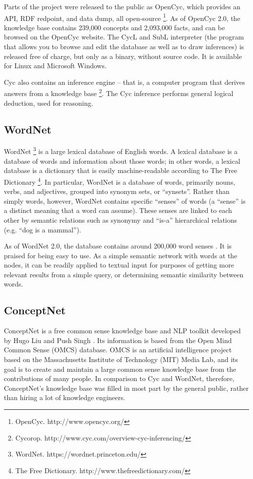 Parts of the project were released to the public as OpenCyc, which provides an API, RDF redpoint, and data dump, all open-source \footnote{OpenCyc. http://www.opencyc.org/}. As of OpenCyc 2.0, the knowledge base contains 239,000 concepts and 2,093,000 facts, and can be browsed on the OpenCyc website. The CycL and SubL interpreter (the program that allows you to browse and edit the database as well as to draw inferences) is released free of charge, but only as a binary, without source code. It is available for Linux and Microsoft Windows.

Cyc also contains an inference engine -- that is, a computer program that derives answers from a knowledge base \footnote{Cycorop. http://www.cyc.com/overview-cyc-inferencing/}. The Cyc inference performs general logical deduction, used for reasoning.

\subsection{WordNet}
WordNet  \footnote{WordNet. https://wordnet.princeton.edu/} is a large lexical database of English words. A lexical database is a database of words and information about those words; in other words, a lexical database is a dictionary that is easily machine-readable according to The Free Dictionary \footnote{The Free Dictionary. http://www.thefreedictionary.com/}. In particular, WordNet is a database of words, primarily nouns, verbs, and adjectives, grouped into synonym sets, or ``synsets''. Rather than simply words, however, WordNet contains specific ``senses'' of words (a ``sense'' is a distinct meaning that a word can assume). These senses are linked to each other by semantic relations such as synonymy and ``is-a'' hierarchical relations (e.g. ``dog is a mammal'').

As of WordNet 2.0, the database contains around 200,000 word senses \cite{LiuSingh2004}. It is praised for being easy to use. As a simple semantic network with words at the nodes, it can be readily applied to textual input for purposes of getting more relevant results from a simple query, or determining semantic similarity between words.

\subsection{ConceptNet}
ConceptNet is a free common sense knowledge base and NLP toolkit developed by Hugo Liu and Push Singh \citeyear{LiuSingh2004}. Its information is based from the Open Mind Common Sense (OMCS) database. OMCS is an artificial intelligence project based on the Massachusetts Institute of Technology (MIT) Media Lab, and its goal is to create and maintain a large common sense knowledge base from the contributions of many people. In comparison to Cyc and WordNet, therefore, ConceptNet's knowledge base was filled in most part by the general public, rather than hiring a lot of knowledge engineers.

